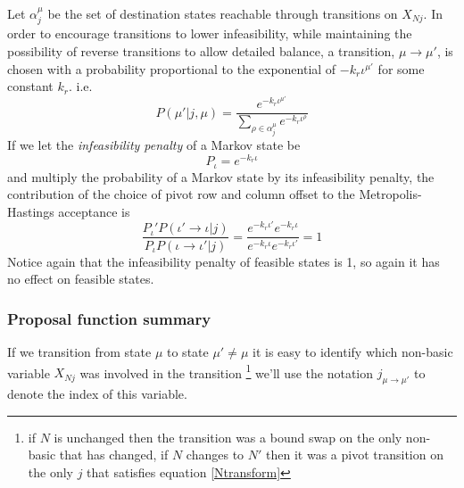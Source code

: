 \documentclass{article}
\begin{document}
Let $\alpha^\mu_j$ be the set of destination states reachable through transitions on $X_{Nj}$. In order to encourage transitions to lower infeasibility, while maintaining the possibility of reverse transitions to allow detailed balance, a transition, $\mu\to\mu'$, is chosen with a probability proportional to the exponential of $-k_r\iota^{\mu'}$ for some constant $k_r$. i.e.
\begin{equation}
P(\mu'|j,\mu) = \frac{e^{-k_r\iota^{\mu'}}}{\sum_{\rho \in \alpha^\mu_j}  e^{-k_r\iota^\rho}}
\label{pTransitionGivenJ}
\end{equation}
If we let the \textit{infeasibility penalty} of a Markov state be
\[
P_\iota = e^{-k_r\iota}
\]
and multiply the probability of a Markov state by its infeasibility penalty, the contribution of the choice of pivot row and column offset to the Metropolis-Hastings acceptance is
\[
\frac{P_\iota' P(\iota'\to\iota|j)}{P_\iota P(\iota\to\iota'|j)} = \frac{e^{-k_r\iota'}e^{-k_r\iota}}{e^{-k_r\iota}e^{-k_r\iota'}} = 1
\]
Notice again that the infeasibility penalty of feasible states is 1, so again it has no effect on feasible states.

\subsubsection{Proposal function summary}

If we transition from state $\mu$ to state $\mu' \ne \mu$ it is easy to identify which non-basic variable $X_{Nj}$ was involved in the transition \footnote{if $N$ is unchanged then the transition was a bound swap on the only non-basic that has changed, if $N$ changes to $N'$ then it was a pivot transition on the only $j$ that satisfies equation \ref{Ntransform}} we'll use the notation $j_{\mu\to\mu'}$ to denote the index of this variable.
\end{document}
